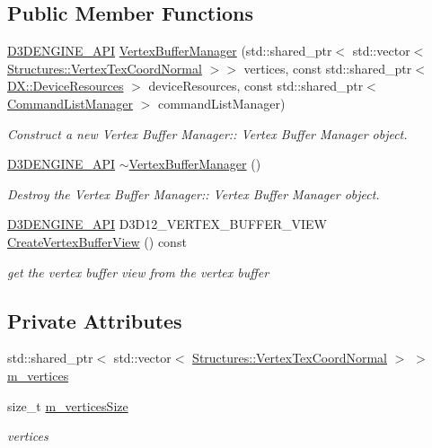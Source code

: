 \subsection*{Public Member Functions}
\begin{DoxyCompactItemize}
\item 
\mbox{\hyperlink{stdafx_8h_a8ee2d990c5dfba7794dd2b60741d7722}{D3\+D\+E\+N\+G\+I\+N\+E\+\_\+\+A\+PI}} \mbox{\hyperlink{class_vertex_buffer_manager_afb1c9143a4178c12e95d6d36f98e7f9a}{Vertex\+Buffer\+Manager}} (std\+::shared\+\_\+ptr$<$ std\+::vector$<$ \mbox{\hyperlink{struct_structures_1_1_vertex_tex_coord_normal}{Structures\+::\+Vertex\+Tex\+Coord\+Normal}} $>$$>$ vertices, const std\+::shared\+\_\+ptr$<$ \mbox{\hyperlink{class_d_x_1_1_device_resources}{D\+X\+::\+Device\+Resources}} $>$ device\+Resources, const std\+::shared\+\_\+ptr$<$ \mbox{\hyperlink{class_command_list_manager}{Command\+List\+Manager}} $>$ command\+List\+Manager)
\begin{DoxyCompactList}\small\item\em Construct a new Vertex Buffer Manager\+:\+: Vertex Buffer Manager object. \end{DoxyCompactList}\item 
\mbox{\hyperlink{stdafx_8h_a8ee2d990c5dfba7794dd2b60741d7722}{D3\+D\+E\+N\+G\+I\+N\+E\+\_\+\+A\+PI}} \mbox{\hyperlink{class_vertex_buffer_manager_aa3ff5c3b6cfc0dbe797bb1d953c62616}{$\sim$\+Vertex\+Buffer\+Manager}} ()
\begin{DoxyCompactList}\small\item\em Destroy the Vertex Buffer Manager\+:\+: Vertex Buffer Manager object. \end{DoxyCompactList}\item 
\mbox{\hyperlink{stdafx_8h_a8ee2d990c5dfba7794dd2b60741d7722}{D3\+D\+E\+N\+G\+I\+N\+E\+\_\+\+A\+PI}} D3\+D12\+\_\+\+V\+E\+R\+T\+E\+X\+\_\+\+B\+U\+F\+F\+E\+R\+\_\+\+V\+I\+EW \mbox{\hyperlink{class_vertex_buffer_manager_a164fa0bdbc01ab468792626bd9f9d109}{Create\+Vertex\+Buffer\+View}} () const
\begin{DoxyCompactList}\small\item\em get the vertex buffer view from the vertex buffer \end{DoxyCompactList}\end{DoxyCompactItemize}
\subsection*{Private Attributes}
\begin{DoxyCompactItemize}
\item 
std\+::shared\+\_\+ptr$<$ std\+::vector$<$ \mbox{\hyperlink{struct_structures_1_1_vertex_tex_coord_normal}{Structures\+::\+Vertex\+Tex\+Coord\+Normal}} $>$ $>$ \mbox{\hyperlink{class_vertex_buffer_manager_adbeb6371c5b6dbd5f2adb57273ee342a}{m\+\_\+vertices}}
\item 
size\+\_\+t \mbox{\hyperlink{class_vertex_buffer_manager_a9d499437ec6b54fd97f27a106b0d424a}{m\+\_\+vertices\+Size}}
\begin{DoxyCompactList}\small\item\em vertices \end{DoxyCompactList}\end{DoxyCompactItemize}


